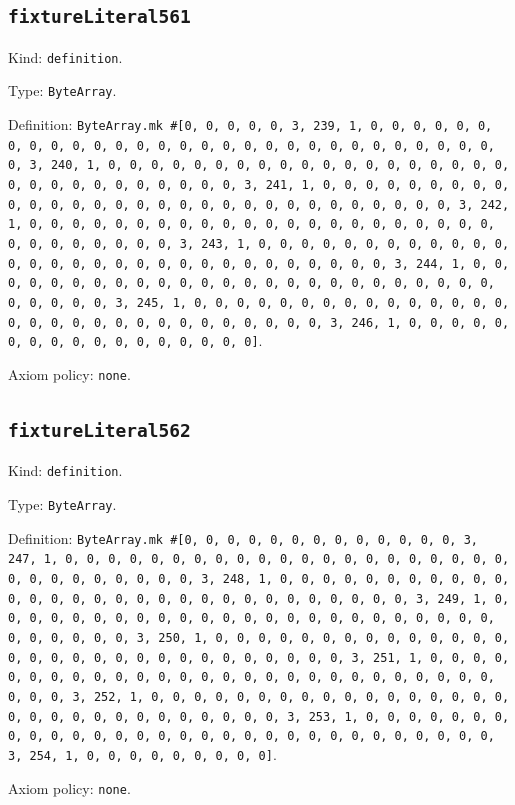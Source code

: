 \documentclass[11pt]{article}
\begin{document}
\subsection*{\texttt{fixtureLiteral561}}
\noindent Kind: \texttt{definition}.\par
\noindent Type: \texttt{ByteArray}.\par
\noindent Definition: \texttt{ByteArray.mk \#[0, 0, 0, 0, 0, 3, 239, 1, 0, 0, 0, 0, 0, 0, 0, 0, 0, 0, 0, 0, 0, 0, 0, 0, 0, 0, 0, 0, 0, 0, 0, 0, 0, 0, 0, 0, 0, 0, 3, 240, 1, 0, 0, 0, 0, 0, 0, 0, 0, 0, 0, 0, 0, 0, 0, 0, 0, 0, 0, 0, 0, 0, 0, 0, 0, 0, 0, 0, 0, 0, 0, 3, 241, 1, 0, 0, 0, 0, 0, 0, 0, 0, 0, 0, 0, 0, 0, 0, 0, 0, 0, 0, 0, 0, 0, 0, 0, 0, 0, 0, 0, 0, 0, 0, 3, 242, 1, 0, 0, 0, 0, 0, 0, 0, 0, 0, 0, 0, 0, 0, 0, 0, 0, 0, 0, 0, 0, 0, 0, 0, 0, 0, 0, 0, 0, 0, 0, 3, 243, 1, 0, 0, 0, 0, 0, 0, 0, 0, 0, 0, 0, 0, 0, 0, 0, 0, 0, 0, 0, 0, 0, 0, 0, 0, 0, 0, 0, 0, 0, 0, 3, 244, 1, 0, 0, 0, 0, 0, 0, 0, 0, 0, 0, 0, 0, 0, 0, 0, 0, 0, 0, 0, 0, 0, 0, 0, 0, 0, 0, 0, 0, 0, 0, 3, 245, 1, 0, 0, 0, 0, 0, 0, 0, 0, 0, 0, 0, 0, 0, 0, 0, 0, 0, 0, 0, 0, 0, 0, 0, 0, 0, 0, 0, 0, 0, 0, 3, 246, 1, 0, 0, 0, 0, 0, 0, 0, 0, 0, 0, 0, 0, 0, 0, 0, 0, 0]}.\par
\noindent Axiom policy: \texttt{none}.\par
\subsection*{\texttt{fixtureLiteral562}}
\noindent Kind: \texttt{definition}.\par
\noindent Type: \texttt{ByteArray}.\par
\noindent Definition: \texttt{ByteArray.mk \#[0, 0, 0, 0, 0, 0, 0, 0, 0, 0, 0, 0, 0, 3, 247, 1, 0, 0, 0, 0, 0, 0, 0, 0, 0, 0, 0, 0, 0, 0, 0, 0, 0, 0, 0, 0, 0, 0, 0, 0, 0, 0, 0, 0, 0, 0, 3, 248, 1, 0, 0, 0, 0, 0, 0, 0, 0, 0, 0, 0, 0, 0, 0, 0, 0, 0, 0, 0, 0, 0, 0, 0, 0, 0, 0, 0, 0, 0, 0, 3, 249, 1, 0, 0, 0, 0, 0, 0, 0, 0, 0, 0, 0, 0, 0, 0, 0, 0, 0, 0, 0, 0, 0, 0, 0, 0, 0, 0, 0, 0, 0, 0, 3, 250, 1, 0, 0, 0, 0, 0, 0, 0, 0, 0, 0, 0, 0, 0, 0, 0, 0, 0, 0, 0, 0, 0, 0, 0, 0, 0, 0, 0, 0, 0, 0, 3, 251, 1, 0, 0, 0, 0, 0, 0, 0, 0, 0, 0, 0, 0, 0, 0, 0, 0, 0, 0, 0, 0, 0, 0, 0, 0, 0, 0, 0, 0, 0, 0, 3, 252, 1, 0, 0, 0, 0, 0, 0, 0, 0, 0, 0, 0, 0, 0, 0, 0, 0, 0, 0, 0, 0, 0, 0, 0, 0, 0, 0, 0, 0, 0, 0, 3, 253, 1, 0, 0, 0, 0, 0, 0, 0, 0, 0, 0, 0, 0, 0, 0, 0, 0, 0, 0, 0, 0, 0, 0, 0, 0, 0, 0, 0, 0, 0, 0, 3, 254, 1, 0, 0, 0, 0, 0, 0, 0, 0, 0]}.\par
\noindent Axiom policy: \texttt{none}.\par
\end{document}
